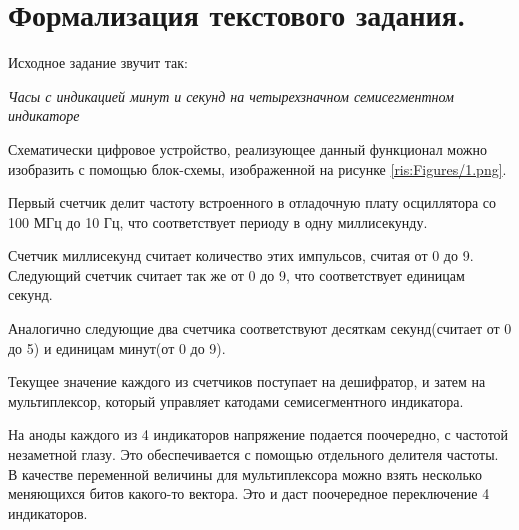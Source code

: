 \begin{sloppypar} %
\newpage %

\section{Формализация текстового задания.} %

Исходное задание звучит так:

\textit{Часы с индикацией минут и секунд на четырехзначном семисегментном индикаторе}
 
 
Схематически цифровое устройство, реализующее данный функционал можно изобразить с помощью блок-схемы, изображенной на рисунке \ref{ris:Figures/1.png}.


Первый счетчик делит частоту встроенного в отладочную плату осциллятора со 100 МГц до 10 Гц, что соответствует периоду в одну миллисекунду.

Счетчик миллисекунд считает количество этих импульсов, считая от 0 до 9. Следующий счетчик считает так же от 0 до 9, что соответствует единицам секунд. 

Аналогично следующие два счетчика соответствуют десяткам секунд(считает от 0 до 5) и единицам минут(от 0 до 9).

Текущее значение каждого из счетчиков поступает на дешифратор, и затем на мультиплексор, который управляет катодами семисегментного индикатора. 
 
На аноды каждого из 4 индикаторов напряжение подается поочередно, с частотой незаметной глазу. Это обеспечивается с помощью отдельного делителя частоты. В качестве переменной величины для мультиплексора можно взять несколько  меняющихся битов какого-то вектора. Это и даст поочередное переключение 4 индикаторов.


\end{sloppypar}
